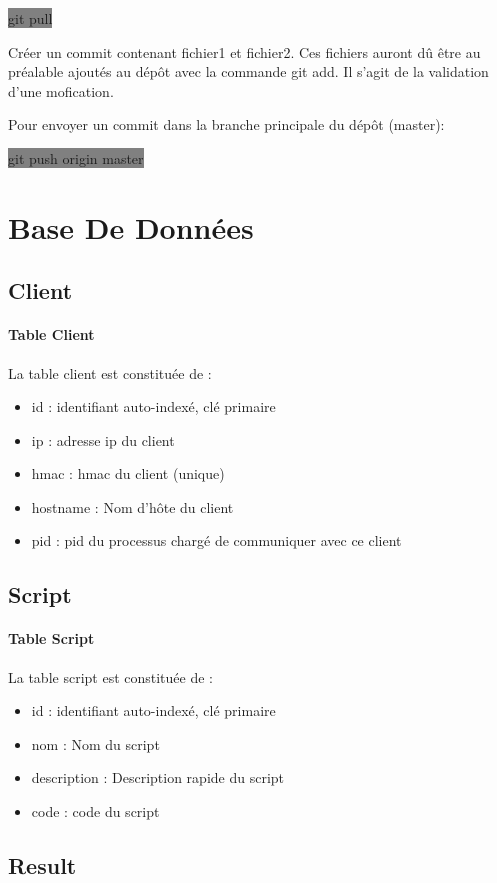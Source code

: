 \documentclass[11pt,a4paper,titlepage, oneside]{article}
\begin{document}
			\colorbox{gray}{git pull}

			Créer un commit contenant fichier1 et fichier2. Ces fichiers auront dû être au préalable ajoutés au dépôt avec la commande git add. Il s'agit de la validation d'une mofication. 

			Pour envoyer un commit dans la branche principale du dépôt (master):
			
			\colorbox{gray}{git push origin master}	

\newpage
\section{{\color{red} Base De Données}}
	\subsection{{\color{blue}Client}}
		\paragraph{Table Client}
			La table client est constituée de :
			\begin{itemize}
				\item id : identifiant auto-indexé, clé primaire
				\item ip : adresse ip du client
				\item hmac : hmac du client (unique)
				\item hostname : Nom d'hôte du client
				\item pid : pid du processus chargé de communiquer avec ce client
			\end{itemize}
	\subsection{{\color{blue} Script}}
		\paragraph{Table Script}
			La table script est constituée de :
			\begin{itemize}
				\item id : identifiant auto-indexé, clé primaire
				\item nom : Nom du script
				\item description : Description rapide du script
				\item code : code du script
			\end{itemize}
	\subsection{{\color{blue}Result}}
\end{document}
